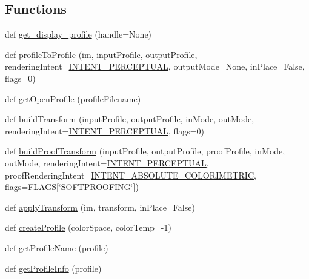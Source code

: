 \subsection*{Functions}
\begin{DoxyCompactItemize}
\item 
def \hyperlink{namespacePIL_1_1ImageCms_ab97a0f99d4796512ebc164a9fd647d24}{get\+\_\+display\+\_\+profile} (handle=None)
\item 
def \hyperlink{namespacePIL_1_1ImageCms_ac22e72af9b4514293b262df91cd37fd3}{profile\+To\+Profile} (im, input\+Profile, output\+Profile, rendering\+Intent=\hyperlink{namespacePIL_1_1ImageCms_a5ede11c95f67c7ea71b86e9a9e8a4f87}{I\+N\+T\+E\+N\+T\+\_\+\+P\+E\+R\+C\+E\+P\+T\+U\+AL}, output\+Mode=None, in\+Place=False, flags=0)
\item 
def \hyperlink{namespacePIL_1_1ImageCms_a13bffc754abdb406a1bbd8f282c97ebb}{get\+Open\+Profile} (profile\+Filename)
\item 
def \hyperlink{namespacePIL_1_1ImageCms_aa7114c26c0427783c135404ce73d28e7}{build\+Transform} (input\+Profile, output\+Profile, in\+Mode, out\+Mode, rendering\+Intent=\hyperlink{namespacePIL_1_1ImageCms_a5ede11c95f67c7ea71b86e9a9e8a4f87}{I\+N\+T\+E\+N\+T\+\_\+\+P\+E\+R\+C\+E\+P\+T\+U\+AL}, flags=0)
\item 
def \hyperlink{namespacePIL_1_1ImageCms_a2dce417677d028e83a5e48c94f1b8d80}{build\+Proof\+Transform} (input\+Profile, output\+Profile, proof\+Profile, in\+Mode, out\+Mode, rendering\+Intent=\hyperlink{namespacePIL_1_1ImageCms_a5ede11c95f67c7ea71b86e9a9e8a4f87}{I\+N\+T\+E\+N\+T\+\_\+\+P\+E\+R\+C\+E\+P\+T\+U\+AL}, proof\+Rendering\+Intent=\hyperlink{namespacePIL_1_1ImageCms_a6704a2c2d4e948b9d74a12a567f68b9e}{I\+N\+T\+E\+N\+T\+\_\+\+A\+B\+S\+O\+L\+U\+T\+E\+\_\+\+C\+O\+L\+O\+R\+I\+M\+E\+T\+R\+IC}, flags=\hyperlink{namespacePIL_1_1ImageCms_a5d515bb9c146f7443320c31c56f35a8f}{F\+L\+A\+GS}\mbox{[}\char`\"{}S\+O\+F\+T\+P\+R\+O\+O\+F\+I\+NG\char`\"{}\mbox{]})
\item 
def \hyperlink{namespacePIL_1_1ImageCms_adff11388c09e5e0feecc550a8ffda483}{apply\+Transform} (im, transform, in\+Place=False)
\item 
def \hyperlink{namespacePIL_1_1ImageCms_a78aa4c3a0a52c2214fd602520d49fba9}{create\+Profile} (color\+Space, color\+Temp=-\/1)
\item 
def \hyperlink{namespacePIL_1_1ImageCms_ae96275c1b44c0ed1055b96559e62b1c1}{get\+Profile\+Name} (profile)
\item 
def \hyperlink{namespacePIL_1_1ImageCms_aa57173c3e27bf505d24446b144766494}{get\+Profile\+Info} (profile)

\end{DoxyCompactItemize}
